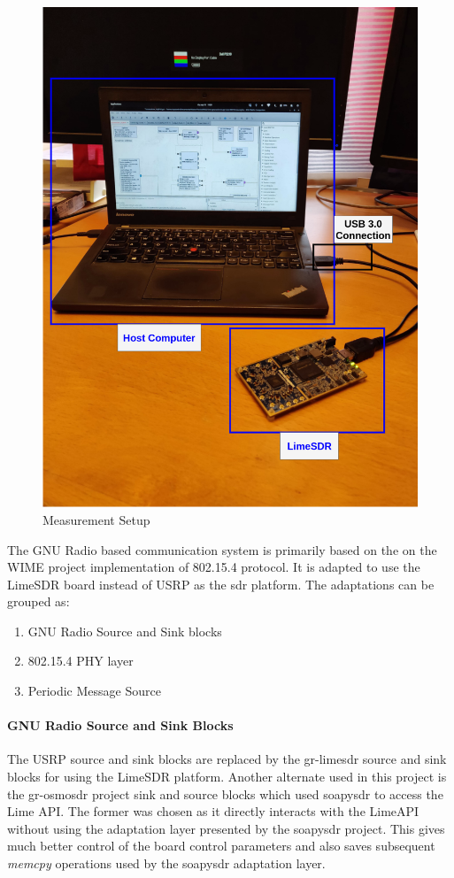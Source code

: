 \begin{figure}[h!]
\centering
\includegraphics[scale=0.2]{Thesis/Figure/MeasurementSetup.png}
\caption{Measurement Setup}
\label{Real_Setup}
\end{figure}


The GNU Radio based communication system is primarily based on the on the WIME project implementation of 802.15.4 protocol. It is adapted to use the LimeSDR board instead of USRP as the \ac{sdr} platform. The adaptations can be grouped as:

\begin{enumerate}
\item{GNU Radio Source and Sink blocks}
\item{802.15.4 \ac{PHY} layer}
\item{Periodic Message Source}
\end{enumerate}

\paragraph{GNU Radio Source and Sink Blocks}
The USRP source and sink blocks are replaced by the gr-limesdr source and sink blocks for using the LimeSDR platform.
Another alternate used in this project is the gr-osmosdr project sink and source blocks which used soapysdr to access the Lime API. The former was chosen as it directly interacts with the LimeAPI without using the adaptation layer presented by the soapysdr project. This gives much better control of the board control parameters and also saves subsequent \textit{memcpy} operations used by the soapysdr adaptation layer.\\

